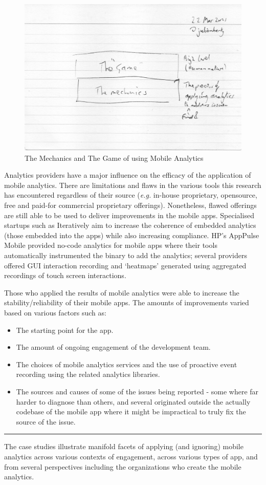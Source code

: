 \begin{figure}
    \centering
    \includegraphics[width=15cm]{images/rough-sketches/The-Mechanics-The-Game.jpeg}
    \caption{The Mechanics and The Game of using Mobile Analytics}
    \label{fig:the-mechanics-the-game}
\end{figure}

Analytics providers have a major influence on the efficacy of the application of mobile analytics. There are limitations and flaws in the various tools this research has encountered regardless of their source (\emph{e.g.} in-house proprietary, opensource, free and paid-for commercial proprietary offerings). Nonetheless, flawed offerings are still able to be used to deliver improvements in the mobile apps. Specialised startups such as Iteratively aim to increase the coherence of embedded analytics (those embedded into the apps) while also increasing compliance. HP's AppPulse Mobile provided no-code analytics for mobile apps where their tools automatically instrumented the binary to add the analytics; several providers offered GUI interaction recording and `heatmaps' generated using aggregated recordings of touch screen interactions.

Those who applied the results of mobile analytics were able to increase the stability/reliability of their mobile apps. The amounts of improvements varied based on various factors such as:
\begin{itemize}
    \item The starting point for the app.
    \item The amount of ongoing engagement of the development team.
    \item The choices of mobile analytics services and the use of proactive event recording using the related analytics libraries.
    \item The sources and causes of some of the issues being reported - some where far harder to diagnose than others, and several originated outside the actually codebase of the mobile app where it might be impractical to truly fix the source of the issue.
\end{itemize}

\noindent
\rule{\textwidth}{0.4pt}

The case studies illustrate manifold facets of applying (and ignoring) mobile analytics across various contexts of engagement, across various types of app, and from several perspectives including the organizations who create the mobile analytics.